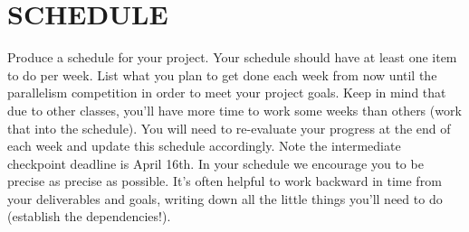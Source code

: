 \documentclass[11pt]{article}
\begin{document}
\section{SCHEDULE} Produce a schedule for your project. Your schedule should have at least one item to do per week. List what you plan to get done each week from now until the parallelism competition in order to meet your project goals. Keep in mind that due to other classes, you'll have more time to work some weeks than others (work that into the schedule). You will need to re-evaluate your progress at the end of each week and update this schedule accordingly. Note the intermediate checkpoint deadline is April 16th. In your schedule we encourage you to be precise as precise as possible. It's often helpful to work backward in time from your deliverables and goals, writing down all the little things you'll need to do (establish the dependencies!).
\label{mylastpagelabel}
\end{document}
